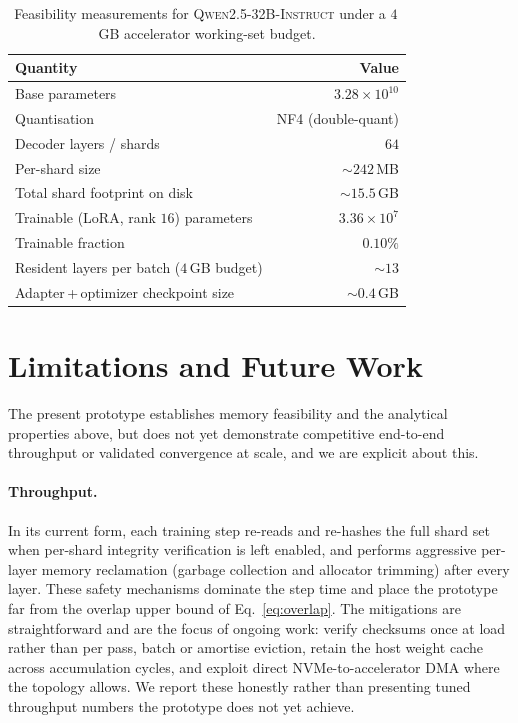 \documentclass{article}
\begin{document}
\begin{table}[t]
  \centering
  \caption{Feasibility measurements for \textsc{Qwen2.5-32B-Instruct} under a
  $4$\,GB accelerator working-set budget.}
  \label{tab:feasibility}
  \begin{tabular}{@{}lr@{}}
    \toprule
    \textbf{Quantity} & \textbf{Value} \\
    \midrule
    Base parameters & $3.28\times10^{10}$ \\
    Quantisation & NF4 (double-quant) \\
    Decoder layers / shards & $64$ \\
    Per-shard size & $\sim$$242$\,MB \\
    Total shard footprint on disk & $\sim$$15.5$\,GB \\
    Trainable (LoRA, rank $16$) parameters & $3.36\times10^{7}$ \\
    Trainable fraction & $0.10\%$ \\
    Resident layers per batch ($4$\,GB budget) & $\sim$$13$ \\
    Adapter\,+\,optimizer checkpoint size & $\sim$$0.4$\,GB \\
    \bottomrule
  \end{tabular}
\end{table}

\section{Limitations and Future Work}
\label{sec:limitations}

The present prototype establishes memory feasibility and the analytical
properties above, but does not yet demonstrate competitive end-to-end throughput
or validated convergence at scale, and we are explicit about this.

\paragraph{Throughput.} In its current form, each training step re-reads and
re-hashes the full shard set when per-shard integrity verification is left
enabled, and performs aggressive per-layer memory reclamation (garbage collection
and allocator trimming) after every layer. These safety mechanisms dominate the
step time and place the prototype far from the overlap upper bound of
Eq.~\eqref{eq:overlap}. The mitigations are straightforward and are the focus of
ongoing work: verify checksums once at load rather than per pass, batch or
amortise eviction, retain the host weight cache across accumulation cycles, and
exploit direct NVMe-to-accelerator DMA where the topology allows. We report these
honestly rather than presenting tuned throughput numbers the prototype does not
yet achieve.
\end{document}
